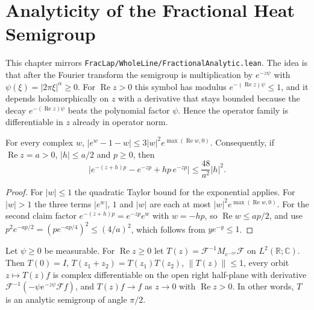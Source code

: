 \chapter{Analyticity of the Fractional Heat Semigroup}

This chapter mirrors \texttt{FracLap/WholeLine/FractionalAnalytic.lean}. The idea is that after the Fourier transform the semigroup is multiplication by $e^{-z\psi}$ with $\psi(\xi) = \lvert 2\pi\xi \rvert^\alpha \ge 0$. For $\operatorname{Re} z > 0$ this symbol has modulus $e^{-(\operatorname{Re} z)\psi} \le 1$, and it depends holomorphically on $z$ with a derivative that stays bounded because the decay $e^{-(\operatorname{Re} z)\psi}$ beats the polynomial factor $\psi$. Hence the operator family is differentiable in $z$ already in operator norm.

\begin{lemma}\label{lem:exp_taylor_symbol}
\leanok
For every complex $w$, $\lvert e^{w} - 1 - w \rvert \le 3 \lvert w \rvert^2 e^{\max(\operatorname{Re} w, 0)}$. Consequently, if $\operatorname{Re} z = a > 0$, $\lvert h \rvert \le a/2$ and $p \ge 0$, then
\[
  \bigl\lvert e^{-(z+h)p} - e^{-zp} + h p\, e^{-zp} \bigr\rvert \le \frac{48}{a^2} \lvert h \rvert^2 .
\]
\end{lemma}

\begin{proof}
\leanok
For $\lvert w \rvert \le 1$ the quadratic Taylor bound for the exponential applies. For $\lvert w \rvert > 1$ the three terms $\lvert e^{w} \rvert$, $1$ and $\lvert w \rvert$ are each at most $\lvert w \rvert^2 e^{\max(\operatorname{Re} w, 0)}$. For the second claim factor $e^{-(z+h)p} = e^{-zp}e^{w}$ with $w = -hp$, so $\operatorname{Re} w \le ap/2$, and use $p^2 e^{-ap/2} = (p e^{-ap/4})^2 \le (4/a)^2$, which follows from $y e^{-y} \le 1$.
\end{proof}

\begin{theorem}\label{thm:s_analytic}
\leanok
Let $\psi \ge 0$ be measurable. For $\operatorname{Re} z \ge 0$ let $T(z) = \mathcal{F}^{-1} M_{e^{-z\psi}} \mathcal{F}$ on $L^2(\mathbb{R};\mathbb{C})$. Then $T(0) = I$, $T(z_1 + z_2) = T(z_1) T(z_2)$, $\lVert T(z) \rVert \le 1$, every orbit $z \mapsto T(z) f$ is complex differentiable on the open right half-plane with derivative $\mathcal{F}^{-1}(-\psi e^{-z\psi} \mathcal{F} f)$, and $T(z) f \to f$ as $z \to 0$ with $\operatorname{Re} z > 0$. In other words, $T$ is an analytic semigroup of angle $\pi/2$.
\end{theorem}

